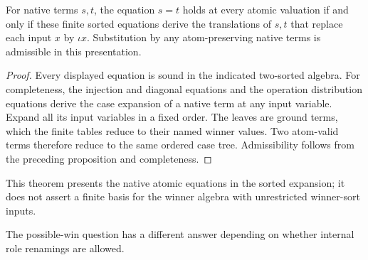 \begin{theorem}
\label{olv:thm:atomic-calculus}
For native terms $s,t$, the equation $s=t$ holds at every atomic
valuation if and only if these finite sorted equations derive the
translations of $s,t$ that replace each input $x$ by $\iota x$.
Substitution by any atom-preserving native terms is admissible in this
presentation.
\end{theorem}
\begin{proof}
Every displayed equation is sound in the indicated two-sorted algebra.
For completeness, the injection and diagonal equations and the operation
distribution equations derive the case expansion of a native term at
any input variable. Expand all its input variables in a fixed order.
The leaves are ground terms, which the finite tables reduce to their
named winner values. Two atom-valid terms therefore reduce to the same
ordered case tree. Admissibility follows from the preceding proposition
and completeness.
\end{proof}

This theorem presents the native atomic equations in the sorted expansion;
it does not assert a finite basis for the winner algebra with unrestricted
winner-sort inputs.

The possible-win question has a different answer depending on whether
internal role renamings are allowed.

